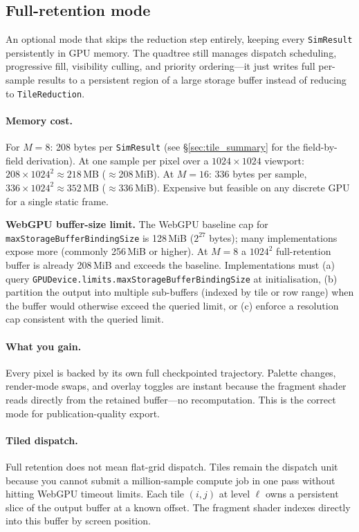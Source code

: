 \documentclass[11pt]{report}
\begin{document}
\subsection{Full-retention mode}
\label{sec:full_retention}

An optional mode that skips the reduction step entirely, keeping every \texttt{SimResult} persistently in GPU memory. The quadtree still manages dispatch scheduling, progressive fill, visibility culling, and priority ordering---it just writes full per-sample results to a persistent region of a large storage buffer instead of reducing to \texttt{TileReduction}.

\paragraph{Memory cost.} For $M=8$: 208 bytes per \texttt{SimResult} (see \S\ref{sec:tile_summary} for the field-by-field derivation). At one sample per pixel over a $1024\times 1024$ viewport: $208\times 1024^2\approx 218$\,MB ($\approx$208\,MiB). At $M=16$: 336 bytes per sample, $336\times 1024^2\approx 352$\,MB ($\approx$336\,MiB). Expensive but feasible on any discrete GPU for a single static frame.

\textbf{WebGPU buffer-size limit.} The WebGPU baseline cap for \texttt{maxStorageBufferBindingSize} is 128\,MiB ($2^{27}$ bytes); many implementations expose more (commonly 256\,MiB or higher). At $M=8$ a $1024^2$ full-retention buffer is already 208\,MiB and exceeds the baseline. Implementations must (a) query \texttt{GPUDevice.limits.maxStorageBufferBindingSize} at initialisation, (b) partition the output into multiple sub-buffers (indexed by tile or row range) when the buffer would otherwise exceed the queried limit, or (c) enforce a resolution cap consistent with the queried limit.

\paragraph{What you gain.} Every pixel is backed by its own full checkpointed trajectory. Palette changes, render-mode swaps, and overlay toggles are instant because the fragment shader reads directly from the retained buffer---no recomputation. This is the correct mode for publication-quality export.

\paragraph{Tiled dispatch.} Full retention does not mean flat-grid dispatch. Tiles remain the dispatch unit because you cannot submit a million-sample compute job in one pass without hitting WebGPU timeout limits. Each tile $(i,j)$ at level $\ell$ owns a persistent slice of the output buffer at a known offset. The fragment shader indexes directly into this buffer by screen position.
\end{document}

